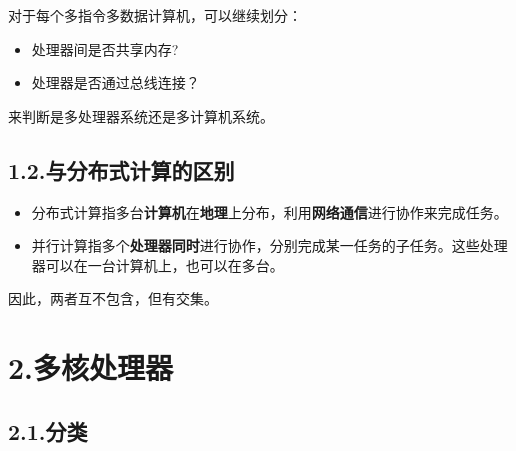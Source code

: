\documentclass{article}
\begin{document}
\noindent{}对于每个多指令多数据计算机，可以继续划分：%

\begin{itemize}[noitemsep,topsep=\mdcompacttopsep]%

\item{}处理器间是否共享内存?%

\item{}处理器是否通过总线连接？%
\end{itemize}%

\noindent{}来判断是多处理器系统还是多计算机系统。%

\subsection{1.2.\hspace*{0.5em}与分布式计算的区别}\label{section}%

\begin{itemize}[noitemsep,topsep=\mdcompacttopsep]%

\item{}分布式计算指多台\textbf{计算机}在\textbf{地理}上分布，利用\textbf{网络通信}进行协作来完成任务。%

\item{}并行计算指多个\textbf{处理器同时}进行协作，分别完成某一任务的子任务。这些处理器可以在一台计算机上，也可以在多台。%
\end{itemize}%

\noindent{}因此，两者互不包含，但有交集。%

\section{2.\hspace*{0.5em}多核处理器}\label{section}%

\subsection{2.1.\hspace*{0.5em}分类}\label{section}%
\end{document}
